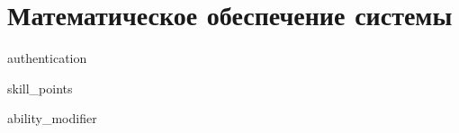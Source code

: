 \section{Математическое обеспечение системы}

{authentication}

{skill_points}

{ability_modifier}

\newpage
